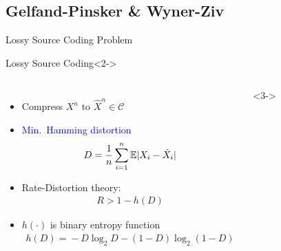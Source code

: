 \documentclass[10pt,presentation]{beamer}
\begin{document}
\subsection{Gelfand-Pinsker \& Wyner-Ziv}
\begin{frame}{Lossy Source Coding Problem}
  \begin{block}{Lossy Source Coding}<2->
    \begin{columns}
      \begin{itemize}
      \item<2-> Compress $X^n$ to $\hat{X}^n \in \mathcal{C}$
      \item<2-> \textcolor{blue}{Min.~Hamming distortion}
        \begin{align*}
          D=\frac{1}{n} \sum_{i=1}^n \mathbb{E} \lvert{X_i-\hat{X}_i}\rvert
        \end{align*}
   \vspace{-4mm}
      \item<3-> Rate-Distortion theory: \vspace{-0.15cm}
        \begin{align*}
          R > 1 - h(D)
        \end{align*}
        \vspace{-7mm}
      \item<3-> $h(\cdot)$ is binary entropy function
        \small{
          \begin{align*}
            h(D)\!=\!-D \log_2 D \!-\! (1\!-\!D) \log_2 (1-D)
          \end{align*}
        }
      \end{itemize}
      <3->
      \setlength\tikzheight{3cm} 
      \setlength\tikzwidth{3.5cm} 
      \centering{}
    \end{columns}
  \end{block}

\end{frame}
\end{document}
